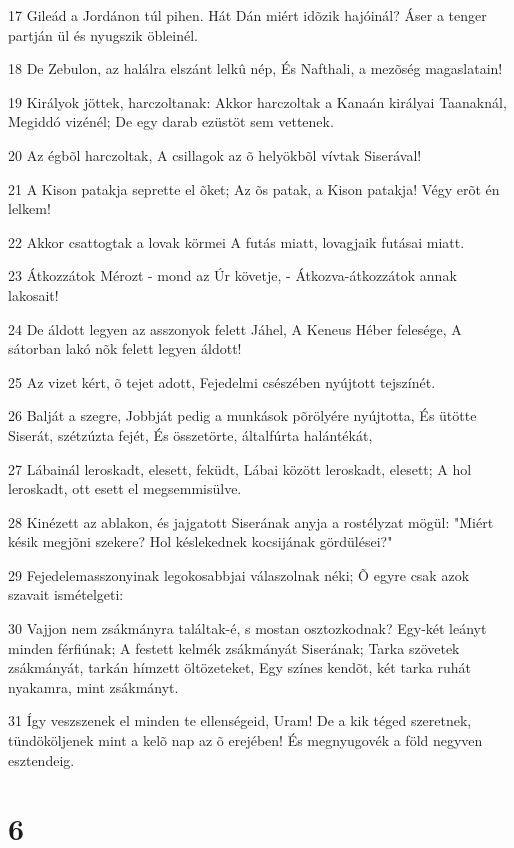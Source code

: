 \par 17 Gileád a Jordánon túl pihen. Hát Dán miért idõzik hajóinál? Áser a tenger partján ül és nyugszik öbleinél.
\par 18 De Zebulon, az halálra elszánt lelkû nép, És Nafthali, a mezõség magaslatain!
\par 19 Királyok jöttek, harczoltanak: Akkor harczoltak a Kanaán királyai Taanaknál, Megiddó vizénél; De egy darab ezüstöt sem vettenek.
\par 20 Az égbõl harczoltak, A csillagok az õ helyökbõl vívtak Siserával!
\par 21 A Kison patakja seprette el õket; Az õs patak, a Kison patakja! Végy erõt én lelkem!
\par 22 Akkor csattogtak a lovak körmei A futás miatt, lovagjaik futásai miatt.
\par 23 Átkozzátok Mérozt - mond az Úr követje, - Átkozva-átkozzátok annak lakosait!
\par 24 De áldott legyen az asszonyok felett Jáhel, A Keneus Héber felesége, A sátorban lakó nõk felett legyen áldott!
\par 25 Az vizet kért, õ tejet adott, Fejedelmi csészében nyújtott tejszínét.
\par 26 Balját a szegre, Jobbját pedig a munkások põrölyére nyújtotta, És ütötte Siserát, szétzúzta fejét, És összetörte, általfúrta halántékát,
\par 27 Lábainál leroskadt, elesett, feküdt, Lábai között leroskadt, elesett; A hol leroskadt, ott esett el megsemmisülve.
\par 28 Kinézett az ablakon, és jajgatott Siserának anyja a rostélyzat mögül: "Miért késik megjõni szekere? Hol késlekednek kocsijának gördülései?"
\par 29 Fejedelemasszonyinak legokosabbjai válaszolnak néki; Õ egyre csak azok szavait ismételgeti:
\par 30 Vajjon nem zsákmányra találtak-é, s mostan osztozkodnak? Egy-két leányt minden férfiúnak; A festett kelmék zsákmányát Siserának; Tarka szövetek zsákmányát, tarkán hímzett öltözeteket, Egy színes kendõt, két tarka ruhát nyakamra, mint zsákmányt.
\par 31 Így veszszenek el minden te ellenségeid, Uram! De a kik téged szeretnek, tündököljenek mint a kelõ nap az õ erejében! És megnyugovék a föld negyven esztendeig.

\chapter{6}

